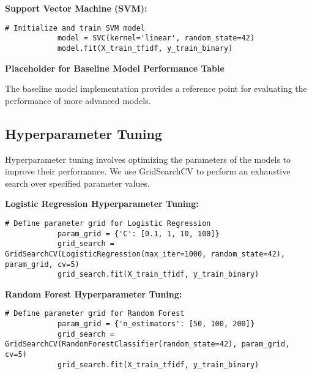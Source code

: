         \vspace{1em}

        \textbf{Support Vector Machine (SVM):}

        \begin{lstlisting}[caption={Train SVM model}, label={lst:svm}]
            # Initialize and train SVM model
            model = SVC(kernel='linear', random_state=42)
            model.fit(X_train_tfidf, y_train_binary)
        \end{lstlisting}
        
        \vspace{1em}

        \textbf{Placeholder for Baseline Model Performance Table}

        The baseline model implementation provides a reference point for evaluating the performance of more advanced models.
            
    \subsection{Hyperparameter Tuning}
    
        Hyperparameter tuning involves optimizing the parameters of the models to improve their performance. We use GridSearchCV to perform an exhaustive search over specified parameter values.

        \textbf{Logistic Regression Hyperparameter Tuning:}

        \begin{lstlisting}[caption={Parameter grid for Logistic Regression}, label={lst:param_grid_logistic}]
            # Define parameter grid for Logistic Regression
            param_grid = {'C': [0.1, 1, 10, 100]}
            grid_search = GridSearchCV(LogisticRegression(max_iter=1000, random_state=42), param_grid, cv=5)
            grid_search.fit(X_train_tfidf, y_train_binary)
        \end{lstlisting}
        
        \vspace{1em}

        \textbf{Random Forest Hyperparameter Tuning:}

        \begin{lstlisting}[caption={Parameter grid for Random Forest}, label={lst:param_grid_rf}]
            # Define parameter grid for Random Forest
            param_grid = {'n_estimators': [50, 100, 200]}
            grid_search = GridSearchCV(RandomForestClassifier(random_state=42), param_grid, cv=5)
            grid_search.fit(X_train_tfidf, y_train_binary)
        \end{lstlisting}
        
